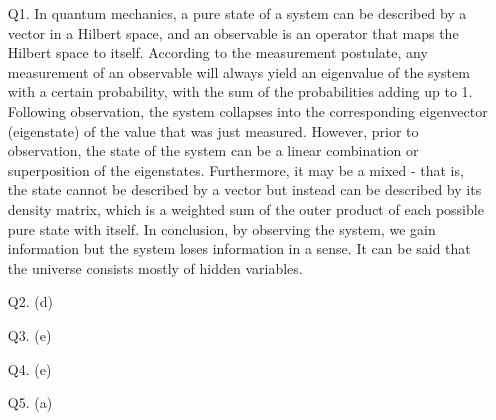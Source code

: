 \documentclass[a4paper,12pt]{article}
\begin{document}
\begin{enumerate}
    \item[Q1.]
        In quantum mechanics, a pure state of a system can be described by a vector in a Hilbert space, and an observable is an operator that maps the Hilbert space to itself. According to the measurement postulate, any measurement of an observable will always yield an eigenvalue of the system with a certain probability, with the sum of the probabilities adding up to 1. Following observation, the system collapses into the corresponding eigenvector (eigenstate) of the value that was just measured. However, prior to observation, the state of the system can be a linear combination or superposition of the eigenstates. Furthermore, it may be a mixed - that is, the state cannot be described by a vector but instead can be described by its density matrix, which is a weighted sum of the outer product of each possible pure state with itself. In conclusion, by observing the system, we gain information but the system loses information in a sense. It can be said that the universe consists mostly of hidden variables.

    \item[Q2.]
        (d)

    \item[Q3.]
        (e)

    \item[Q4.]
        (e)

    \item[Q5.]
        (a)
\end{enumerate}
\end{document}
